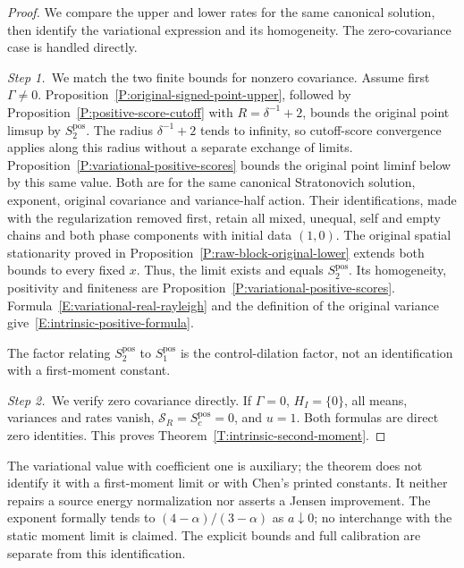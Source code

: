 \begin{proof}
  We compare the upper and lower rates for the same canonical solution, then
  identify the variational expression and its homogeneity. The zero-covariance
  case is handled directly.


  \medskip
  \noindent\textit{Step 1.~}We match the two finite bounds for nonzero
  covariance.
  Assume first $\Gamma \ne 0$. Proposition~\ref{P:original-signed-point-upper},
  followed by Proposition~\ref{P:positive-score-cutoff} with $R =
  \delta^{-1}+2$, bounds the original point limsup by $S_2^{\mathrm{pos}}$.
  The radius $\delta^{-1}+2$ tends to infinity, so cutoff-score convergence
  applies along this radius without a separate exchange of limits.
  Proposition~\ref{P:variational-positive-scores} bounds the original point
  liminf below by this same value. Both are for the same canonical Stratonovich
  solution, exponent, original covariance and variance-half action. Their
  identifications, made with the regularization removed first, retain all mixed,
  unequal, self and empty chains and both phase components with initial data
  $(1,0)$. The
  original spatial stationarity proved in
  Proposition~\ref{P:raw-block-original-lower} extends both bounds to every
  fixed $x$. Thus, the limit exists and equals $S_2^{\mathrm{pos}}$. Its
  homogeneity, positivity and finiteness are
  Proposition~\ref{P:variational-positive-scores}.
  Formula~\eqref{E:variational-real-rayleigh} and the definition of the original
  variance give~\eqref{E:intrinsic-positive-formula}.


  The factor relating $S_2^{\mathrm{pos}}$ to $S_1^{\mathrm{pos}}$ is the
  control-dilation factor, not an identification with a first-moment constant.

  \medskip
  \noindent\textit{Step 2.~}We verify zero covariance directly.
  If $\Gamma = 0$, $H_I = \{0\}$, all means, variances and rates vanish,
  $\mathcal{S}_R = S_c^{\mathrm{pos}} = 0$, and $u = 1$. Both formulas are
  direct zero identities. This proves Theorem~\ref{T:intrinsic-second-moment}.
\end{proof}

The variational value with coefficient one is auxiliary; the theorem does not
identify it with a first-moment limit or with Chen's printed constants. It
neither repairs a source energy normalization nor asserts a Jensen improvement.
The exponent formally tends to $(4-\alpha)/(3-\alpha)$ as $a\downarrow0$; no
interchange with the static moment limit is claimed. The explicit bounds and
full calibration are separate from this identification.
